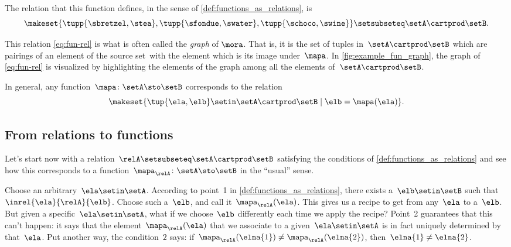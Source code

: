 The relation that this function defines, in the sense of \cref{def:functions_as_relations}, is
%
\begin{equation}
    \label{eq:fun-rel}
    \makeset{ \tupp{\sbretzel, \stea}, \tupp{\sfondue, \swater}, \tupp{\schoco, \swine} } \setsubseteq \setA \cartprod \setB.
\end{equation}
\begin{marginfigure}
    \centering
    \caption{The graph of the function \cref{eq:fun-rel}.}
    \label{fig:example_fun_graph}
\end{marginfigure}

This relation \cref{eq:fun-rel} is what is often called the \emph{graph} of $\mora$.
That is, it is the set of tuples in~$\setA \cartprod \setB$ which are pairings of an element of the source set~\setA with the element which is its image under~$\mapa$.
In \cref{fig:example_fun_graph}, the graph of \cref{eq:fun-rel} is visualized by highlighting the elements of the graph among all the elements of~$\setA \cartprod \setB$.

In general, any function~$\mapa \colon \setA \sto \setB$ corresponds to the relation
\begin{equation}
    \makeset{ \tup{\ela,\elb} \setin \setA \cartprod \setB \mid \elb= \mapa(\ela) }.
\end{equation}

\subsection{From relations to functions}

Let's start now with a relation~$\relA \setsubseteq \setA \cartprod \setB$ satisfying the conditions of \cref{def:functions_as_relations} and see how this corresponds to a function~$\mapa_{\relA} \colon \setA \sto \setB$ in the ``usual'' sense.

Choose an arbitrary~$\ela \setin \setA$.
According to point~1 in \cref{def:functions_as_relations}, there exists a~$\elb \setin \setB$ such that~$\inrel{\ela}{\relA}{\elb}$.
Choose such a~$\elb$, and call it~$\mapa_{\relA}(\ela)$.
This gives us a recipe to get from any~$\ela$ to a~$\elb$.
But given a specific~$\ela \setin \setA$, what if we choose~$\elb$ differently each time we apply the recipe?
Point~2 guarantees that this can't happen: it says that the element~$\mapa_{\relA}(\ela)$ that we associate to a given~$\ela \setin \setA$ is in fact uniquely determined by that~$\ela$.
Put another way, the condition~$2$ says: if~$\mapa_{\relA}(\elna{1}) \neq \mapa_{\relA}(\elna{2})$, then~$\elna{1} \neq\elna{2}$.

